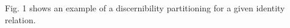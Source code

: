 Fig. 1 shows an example
  of a discernibility partitioning for a given identity relation.

\begin{comment}
\begin{figure*}
\label{fig:iimb_example}
\centering
\texttt{[image: iimb\_approximation\_example\_crop]}
\caption{
  An example of a discernibility partition for an identity relation
    consisting of 365 pairs applied to the fourth IIMB linkset.
  Each node is annotated with the set of predicates $P$ for which
    its pairs are $P$-indiscernible.
  The number of identity pairs within each partition set
    is displayed to the right of the predicate set label.
  Partition sets that contain no identity pair are not show.
  The number that occurs to the left of the predicate label in each node
    indicates how may pairs in that node are identity pairs.
  The lower approximation consists of the nodes with a solid border,
    indicating that they contain only identity pairs.
  The higher approximation consists of all displayed nodes.}
\end{figure*}

\footnote{
  $P$ must be closed under the identity relation, i.e.,
  \begin{equation*}
    cl_{\sim}(P) = \bigcup_{\tuple{\range{p_1}{p_n}} \in P}\nolimits (
      [p_1]_{\sim} \times \ldots \times [p_n]_{\sim}
    )
  \end{equation*}
}
\end{comment}

